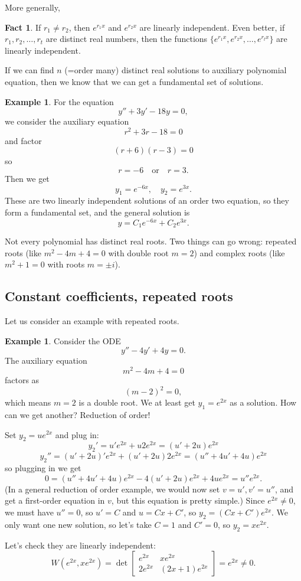 \documentclass[12pt]{amsart}
\numberwithin{equation}{section}
\theoremstyle{plain} %
\theoremstyle{definition}
\newtheorem{ex}[equation]{Example}
\newtheorem{fact}[equation]{Fact}
\theoremstyle{remark}
\begin{document}
More generally,
\begin{fact} If $r_1\neq r_2$, then $e^{r_1 x}$ and $e^{r_2 x}$ are linearly independent. Even better, if $r_1, r_2,\dots, r_t$ are distinct real numbers, then the functions $\{ e^{r_1 x}, e^{r_2 x},\dots,e^{r_t x}\}$ are linearly independent.
\end{fact}

If we can find $n$ (=order many) distinct real solutions to auxiliary polynomial equation, then we know that we can get a fundamental set of solutions.

\begin{ex}
For the equation
\[ y'' + 3y' -18y = 0,\]
we consider the auxiliary equation
\[ r^2 + 3r -18=0\]
and factor
\[ (r+6)(r-3)=0\]
so
\[ r=-6 \quad \text{or} \quad r=3.\]
Then we get 
\[ y_1= e^{-6x}, \quad y_2= e^{3x}.\]
These are two linearly independent solutions of an order two equation, so they form a fundamental set,
and the general solution is
\[ y = C_1 e^{-6x} +C_2 e^{3x}.\]
\end{ex}


Not every polynomial has distinct real roots. Two things can go wrong: repeated roots (like $m^2 - 4m + 4 = 0$ with double root $m=2$) and complex roots (like $m^2+ 1= 0$ with roots $m=\pm i$).


\subsection*{Constant coefficients, repeated roots}

Let us consider an example with repeated roots.

\begin{ex} Consider the ODE
\[ y'' - 4y' + 4y = 0.\]
The auxiliary equation
\[ m^2 - 4m + 4=0\]
factors as
\[ (m-2)^2 = 0,\]
which means $m=2$ is a double root. We at least get $y_1=e^{2x}$ as a solution. How can we get another? Reduction of order!

Set $y_2 = u e^{2x}$ and plug in:
\[ y_2'= u' e^{2x} + u 2e^{2x} = (u' + 2u)e^{2x}\]
\[ y_2''= (u'+2u)' e^{2x} + (u'+2u)2e^{2x} = (u'' + 4u' + 4u) e^{2x}\]
so plugging in we get
\[ 0= (u'' + 4u' + 4u) e^{2x} - 4 (u' + 2u)e^{2x} + 4u e^{2x} = u'' e^{2x}.\]
(In a general reduction of order example, we would now set ${v=u'}, {v' = u''}$, and get a first-order equation in $v$, but this equation is pretty simple.)
Since $e^{2x}\neq 0$, we must have $u'' = 0$, so $u' = C$ and $u=Cx+C'$, so $y_2 = (Cx+C') e^{2x}$.
We only want one new solution, so let's take $C=1$ and $C'=0$, so $y_2 = xe^{2x}$. 

Let's check they are linearly independent:
\[ W(e^{2x}, xe^{2x}) = \det \begin{bmatrix} e^{2x} & xe^{2x} \\ 2e^{2x} & (2x+1) e^{2x} \end{bmatrix} = e^{2x} \neq 0.\]
\end{ex}
\end{document}
